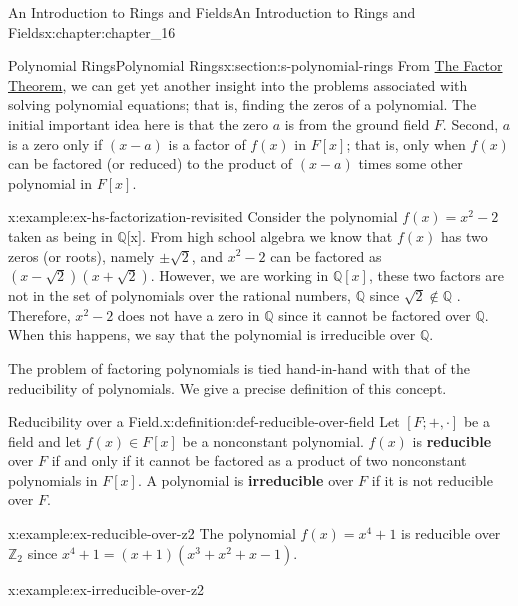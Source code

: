 \documentclass[oneside,10pt,]{book}
\newcommand{\terminology}[1]{\textbf{#1}}
\numberwithin{equation}{section}
\begin{document}
\begin{chapterptx}{An Introduction to Rings and Fields}{}{An Introduction to Rings and Fields}{}{}{x:chapter:chapter_16}
\begin{sectionptx}{Polynomial Rings}{}{Polynomial Rings}{}{}{x:section:s-polynomial-rings}
From \hyperref[x:theorem:theorem-polynomial-factor]{The Factor Theorem}, we can get yet another insight into the problems associated with solving polynomial equations; that is, finding the zeros of a polynomial. The initial important idea here is that the zero \(a\) is from the ground field \(F\). Second, \(a\) is a zero only if \((x - a)\) is a factor of \(f(x)\) in \(F[x]\); that is, only when \(f(x)\) can be factored (or reduced) to the product of \((x - a)\) times some other polynomial in \(F[x]\).%
\begin{example}{}{x:example:ex-hs-factorization-revisited}%
Consider the polynomial \(f(x) = x^2-2\) taken as being in \(\mathbb{Q}\)[x]. From high school algebra we know that \(f(x)\) has two zeros (or roots), namely \(\pm \sqrt{2}\), and \(x^2 - 2\) can be factored  as \(\left(x - \sqrt{2}\right) \left(x + \sqrt{2}\right)\). However, we are working in \(\mathbb{Q}[x]\), these two factors are not in the set of polynomials over the rational numbers, \(\mathbb{Q}\)  since \(\sqrt{2} \notin \mathbb{Q}\) .   Therefore, \(x^2 - 2\) does not have a zero in \(\mathbb{Q}\) since it cannot be factored over \(\mathbb{Q}\). When this happens, we say that the polynomial is irreducible over \(\mathbb{Q}\).%
\end{example}
The problem of factoring polynomials is tied hand-in-hand with that of the reducibility of polynomials. We give a precise definition of this concept.%
\begin{definition}{Reducibility over a Field.}{x:definition:def-reducible-over-field}%
%
%
%
Let \([F; +, \cdot]\)  be a field and let \(f(x) \in F[x]\) be a nonconstant polynomial. \(f(x)\) is  \terminology{reducible} over \(F\) if and only if it cannot be factored as a product of two nonconstant polynomials in \(F[x]\). A polynomial is \terminology{irreducible} over  \(F\) if it is not reducible over \(F\).%
\end{definition}
\begin{example}{}{x:example:ex-reducible-over-z2}%
The polynomial \(f(x) = x^4 + 1\)  is reducible over  \(\mathbb{Z}_2\) since \(x^4 + 1 = (x + 1)\left(x^3 + x^2 + x - 1\right).\)%
\end{example}
\begin{example}{}{x:example:ex-irreducible-over-z2}%

\end{example}
\end{sectionptx}
\end{chapterptx}
\end{document}
